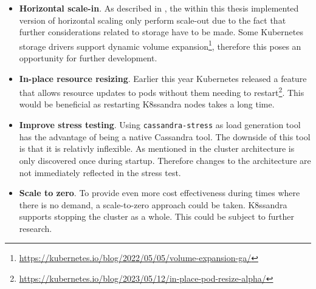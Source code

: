 \begin{itemize}
    \item \textbf{Horizontal scale-in}. As described in , the within this thesis implemented version of horizontal scaling only perform scale-out due to the fact that further considerations related to storage have to be made. Some Kubernetes storage drivers support dynamic volume expansion\footnote{\url{https://kubernetes.io/blog/2022/05/05/volume-expansion-ga/}}, therefore this poses an opportunity for further development.

    \item \textbf{In-place resource resizing}. Earlier this year Kubernetes released a feature that allows resource updates to pods without them needing to restart\footnote{\url{https://kubernetes.io/blog/2023/05/12/in-place-pod-resize-alpha/}}. This would be beneficial as restarting K8ssandra nodes takes a long time.

    \item \textbf{Improve stress testing}. Using \texttt{cassandra-stress} as load generation tool has the advantage of being a native Cassandra tool. The downside of this tool is that it is relativly inflexible. As mentioned in  the cluster architecture is only discovered once during startup. Therefore changes to the architecture are not immediately reflected in the stress test.

    \item \textbf{Scale to zero}. To provide even more cost effectiveness during times where there is no demand, a scale-to-zero approach could be taken. K8ssandra supports stopping the cluster as a whole. This could be subject to further research.
\end{itemize}
